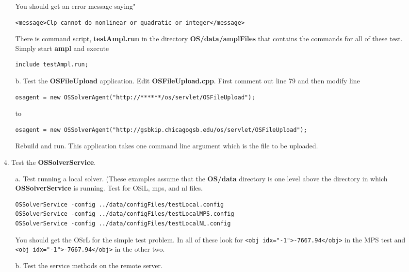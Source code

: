 \begin{itemize}
\begin{itemize}
You should get an error message saying"
\begin{verbatim}
<message>Clp cannot do nonlinear or quadratic or integer</message>
\end{verbatim}



There is command script, {\bf testAmpl.run} in the directory {\bf OS/data/amplFiles} that contains the commands for all of these test. Simply start {\bf ampl} and execute
\begin{verbatim}
include testAmpl.run;
\end{verbatim}



\item[b.] Test the {\bf OSFileUpload} application.    Edit  {\bf OSFileUpload.cpp}. First comment out line 79 and then modify line 
\begin{verbatim}
osagent = new OSSolverAgent("http://******/os/servlet/OSFileUpload");
\end{verbatim}
to
{\small
\begin{verbatim}
osagent = new OSSolverAgent("http://gsbkip.chicagogsb.edu/os/servlet/OSFileUpload");
\end{verbatim}
}
Rebuild and run. This application takes one command line argument which is the file to be uploaded. 

\end{itemize}

\item[4.] Test the {\bf OSSolverService}.

\begin{itemize}
\item[a.] Test running a local solver.  (These examples assume that the {\bf OS/data} directory is one level above the directory  in which {\bf OSSolverService} is running. Test  for OSiL, mps, and nl files.

\begin{verbatim}
OSSolverService -config ../data/configFiles/testLocal.config
OSSolverService -config ../data/configFiles/testLocalMPS.config
OSSolverService -config ../data/configFiles/testLocalNL.config
\end{verbatim}


You should get the OSrL for the simple test problem.   In all of these look for {\tt <obj idx="-1">-7667.94</obj>} in the MPS test and {\tt <obj idx="-1">-7667.94</obj>} in the other two.


\item[b.]  Test the service methods on the remote server.  



\end{itemize}
\end{itemize}
